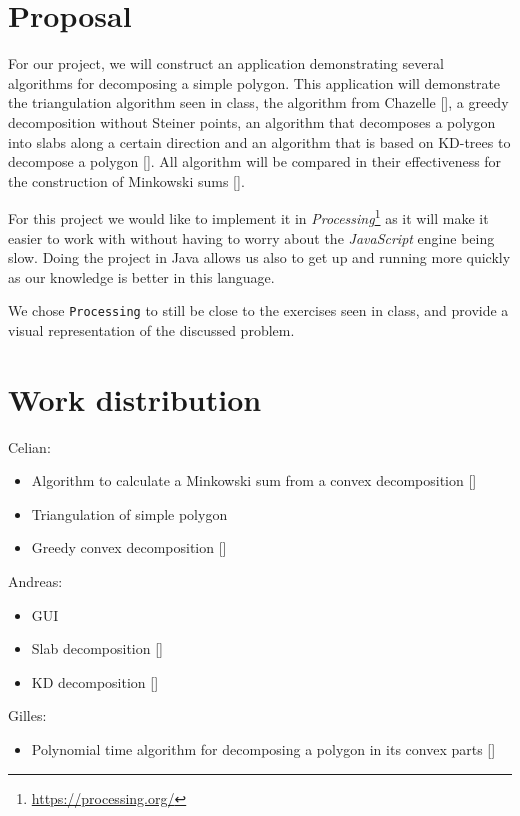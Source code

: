 \documentclass[11pt,a4paper]{article}
\begin{document}
\BgThispage



\clearpage
{}

\section{Proposal}

For our project, we will construct an application demonstrating several
algorithms for decomposing a simple polygon.
This application will demonstrate the triangulation algorithm seen in class,
the algorithm from Chazelle [\cite{chazelle_decomposing_1979}], a greedy
decomposition without Steiner points, an algorithm that decomposes a
polygon into slabs along a certain direction and an algorithm that is based on
KD-trees to decompose a polygon [\cite{agarwal_polygon_2002}]. All algorithm
will be compared in their effectiveness for the construction of Minkowski sums
[\cite{agarwal_polygon_2002}].

For this project we would like to implement it in
\emph{Processing}\footnote{\url{https://processing.org/}} as it will make it
easier to work with without having to worry about the \emph{JavaScript} engine
being slow.
Doing the project in Java allows us also to get up and running more quickly as
our knowledge is better in this language.

We chose \verb|Processing| to still be close to the exercises seen in class, and
provide a visual representation of the discussed problem.

\section{Work distribution}

Celian:
\begin{itemize}
    \item Algorithm to calculate a Minkowski sum from a convex decomposition [\cite{agarwal_polygon_2002}]
    \item Triangulation of simple polygon
    \item Greedy convex decomposition [\cite{agarwal_polygon_2002}]
\end{itemize}

Andreas:
\begin{itemize}
    \item GUI
    \item Slab decomposition [\cite{agarwal_polygon_2002}]
    \item KD decomposition [\cite{agarwal_polygon_2002}]
\end{itemize}

Gilles:
\begin{itemize}
    \item Polynomial time algorithm for decomposing a polygon in its convex
        parts [\cite{chazelle_decomposing_1979}]
\end{itemize}

\printbibliography
\end{document}
